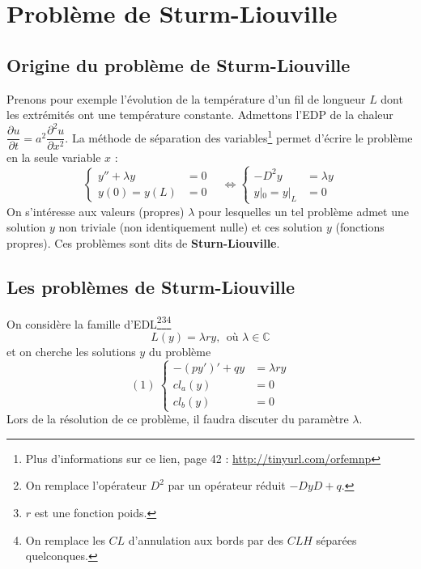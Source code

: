 \documentclass[11pt, a4paper, openany]{book}
\begin{document}
													
		\newpage
		\section{Problème de Sturm-Liouville}
		\subsection{Origine du problème de Sturm-Liouville}
		Prenons pour exemple l'évolution de la température d'un fil de longueur $L$ dont les extrémités ont une température constante. Admettons l'EDP de la chaleur $\dfrac{\partial u}{\partial t} = a^2\dfrac{\partial^2u}{\partial x^2}$. La méthode de séparation des variables\footnote{Plus d'informations sur ce lien, page 42 : \url{http://tinyurl.com/orfemnp}} permet d'écrire le problème en la seule variable $x$ : 
		\begin{equation}
			\left\{\begin{array}{ll}
			y''+\lambda y &=0\\
			y(0)=y(L) &=0
			\end{array}\right.\ \ \ \ \Leftrightarrow
			\left\{\begin{array}{ll}
			-D^2y &= \lambda y\\
			y|_0 = y|_L &= 0
			\end{array}\right.
		\end{equation}
		On s'intéresse aux valeurs (propres) $\lambda$ pour lesquelles un tel problème admet une solution $y$ non triviale (non identiquement nulle) et ces solution $y$ (fonctions propres). Ces problèmes sont dits de \textbf{Sturn-Liouville}.
													
													
		\subsection{Les problèmes de Sturm-Liouville}
		On considère la famille d'EDL\footnote{On remplace l'opérateur $D^2$ par un opérateur réduit $-DyD+q$.}\footnote{$r$ est une fonction poids. }\footnote{On remplace les $CL$ d'annulation aux bords par des $CLH$ séparées quelconques.}
		\begin{equation}
			L(y) = \lambda ry,\ \ \text{où } \lambda \in \mathbb{C}
		\end{equation}
		et on cherche les solutions $y$ du problème
		\begin{equation}
			(1)\ \left\{\begin{array}{ll}
			-(py')' + qy &= \lambda r y\\
			cl_a(y) &= 0\\
			cl_b(y) &= 0
			\end{array}\right.
		\end{equation}
		Lors de la résolution de ce problème, il faudra discuter du paramètre $\lambda$.\\
													
\end{document}
